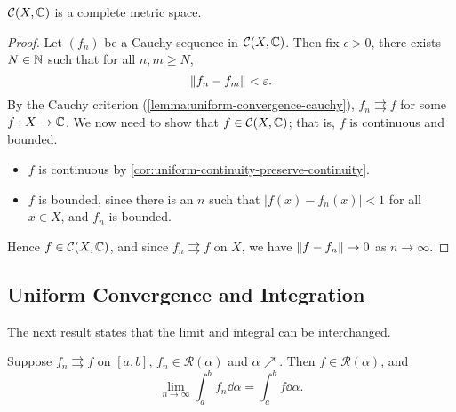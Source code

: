 \begin{lemma}
$\mathcal{C}(X,\mathbb C)$ is a complete metric space.
\end{lemma}

\begin{proof}
Let $(f_n)$ be a Cauchy sequence in $\mathcal{C}(X,\mathbb C)$. Then fix $\epsilon>0$, there exists $N\in\mathbb N$ such that for all $n,m\ge N$,
\[\norm{f_n-f_m}<\varepsilon.\]
By the Cauchy criterion (\ref{lemma:uniform-convergence-cauchy}), $f_n\rightrightarrows f$ for some $f:X\to\mathbb C$. 
We now need to show that $f\in\mathcal{C}(X,\mathbb C)$; that is, $f$ is continuous and bounded.
\begin{itemize}
\item $f$ is continuous by \ref{cor:uniform-continuity-preserve-continuity}.
\item $f$ is bounded, since there is an $n$ such that $|f(x)-f_n(x)|<1$ for all $x\in X$, and $f_n$ is bounded.
\end{itemize}
Hence $f\in\mathcal{C}(X,\mathbb C)$, and since $f_n\rightrightarrows f$ on $X$, we have $\norm{f-f_n}\to0$ as $n\to\infty$.
\end{proof}
\pagebreak

\subsection{Uniform Convergence and Integration}
The next result states that the limit and integral can be interchanged.

\begin{proposition}\label{prop:uniform-convergence-integration}
Suppose $f_n\rightrightarrows f$ on $[a,b]$, $f_n\in\mathcal{R}(\alpha)$ and $\alpha\nearrow$. Then $f\in\mathcal{R}(\alpha)$, and
\begin{equation}\label{eqn:uniform-convergence-integration}
\lim_{n\to\infty}\int_{a}^{b}f_n\dd{\alpha}=\int_{a}^{b}f\dd{\alpha}.
\end{equation}
\end{proposition}

